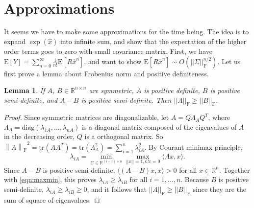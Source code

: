 \documentclass[10pt]{article}
\newtheorem{lemma}{Lemma}
\newcommand{\fnorm}[1]{\ensuremath{\left\| #1 \right\|_\mathrm{F}}}
\begin{document}
\section{Approximations}
It seems we have to make some approximations for the time being.
The idea is to expand $\exp(\hat{x})$ into infinite sum, and show that the expectation of the higher order terms goes to zero with small covariance matrix.
First, we have $\mathrm{E}[Y] = \sum_{n=0}^{\infty}\frac{1}{n!}\mathrm{E}[R\hat{x}^n]$, and want to show $\mathrm{E}[R\hat{x}^n]\sim O(||\Sigma||_\mathrm{F}^{n/2})$.
Let us first prove a lemma about Frobenius norm and positive definiteness.

\begin{lemma} \label{lamma:fnorm}
	If $A$, $B\in\mathbb{R}^{n\times n}$ are symmetric, $A$ is positive definite, $B$ is positive semi-definite, and $A-B$ is positive semi-definite. Then $||A||_\mathrm{F}\geq||B||_\mathrm{F}$.
\end{lemma}
\begin{proof}
	Since symmetric matrices are diagonalizable, let $A=Q\Lambda_AQ^T$, where $\Lambda_A=\mathrm{diag}(\lambda_{1A},\ldots,\lambda_{nA})$ is a diagonal matrix composed of the eigenvalues of $A$ in the decreasing order, $Q$ is a orthogonal matrix.
	So $\fnorm{A}^2 = \mathrm{tr}(AA^T) = \mathrm{tr}(\Lambda_A^2) = \sum_{i=1}^{n}\lambda_{iA}^2$.
	By Courant minimax principle,
	\begin{equation} \label{eqn:maxmin}
		\lambda_{iA} = \min_{C\in\mathbb{R}^{(i-1)\times n}}\max_{||x||=1,Cx=0}\langle Ax,x \rangle.
	\end{equation}
	Since $A-B$ is
	 positive semi-definite, $\langle(A-B)x,x\rangle > 0$ for all $x\in\mathbb{R}^n$.
	Together with \eqref{eqn:maxmin}, this proves $\lambda_{iA}\geq\lambda_{iB}$ for all $i=1,\ldots,n$.
	Because $B$ is positive semi-definite, $\lambda_{iA}\geq\lambda_{iB}\geq 0$, and it follows that $||A||_\mathrm{F}\geq||B||_\mathrm{F}$ since they are the sum of square of eigenvalues.
\end{proof}
\end{document}
